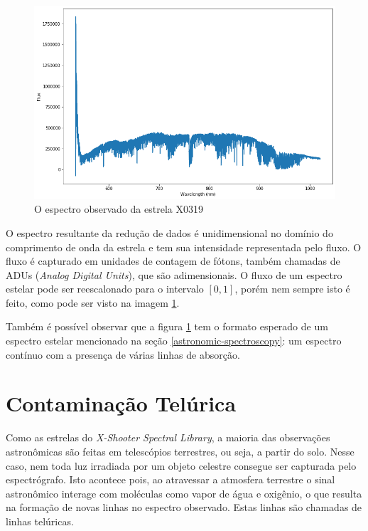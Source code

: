 \begin{figure}[htb]
\centering
\includegraphics[width=15cm]{figuras/X0319_obs_spectrum.png}
\caption{O espectro observado da estrela X0319}
\label{fig:x0319-obs-spectrum}
\end{figure}

O espectro resultante da redução de dados é unidimensional no domínio do comprimento de onda da estrela e tem sua intensidade representada pelo fluxo. O fluxo é capturado em unidades de contagem de fótons, também chamadas de ADUs (\textit{Analog Digital Units}), que são adimensionais. O fluxo de um espectro estelar pode ser reescalonado para o intervalo $[0, 1]$, porém nem sempre isto é feito, como pode ser visto na imagem \ref{fig:x0319-obs-spectrum}. 

Também é possível observar que a figura \ref{fig:x0319-obs-spectrum} tem o formato esperado de um espectro estelar mencionado na seção \ref{astronomic-spectroscopy}: um espectro contínuo com a presença de várias linhas de absorção.


\section{Contaminação Telúrica}

Como as estrelas do \textit{X-Shooter Spectral Library}, a maioria das observações astronômicas são feitas em telescópios terrestres, ou seja, a partir do solo. Nesse caso, nem toda luz irradiada por um objeto celestre consegue ser capturada pelo espectrógrafo. Isto acontece pois, ao atravessar a atmosfera terrestre o sinal astronômico interage com moléculas como vapor de água e oxigênio, o que resulta na formação de novas linhas no espectro observado. Estas linhas são chamadas de linhas telúricas. 

